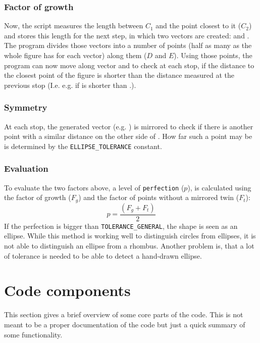 \documentclass[12pt, a4paper]{article}
\begin{document}
            \subsubsection*{Factor of growth}
                Now, the script measures the length between $C_1$ and the point closest to it ($C_2$) and stores this length for the next step, in which two vectors are created:  and . The program divides those vectors into a number of points (half as many as the whole figure has for each vector) along them ($D$ and $E$). Using those points, the program can now move along vector  and  to check at each stop, if the distance to the closest point of the figure is shorter than the distance measured at the previous stop (I.e. e.g. if  is shorter than .). 

            \subsubsection*{Symmetry}
                At each stop, the generated vector (e.g. ) is mirrored to check if there is another point with a similar distance on the other side of . How far such a point may be is determined by the \texttt{ELLIPSE\_TOLERANCE} constant.\hfill

            \subsubsection*{Evaluation}
                To evaluate the two factors above, a level of \texttt{perfection} ($p$), is calculated using the factor of growth ($F_g$) and the factor of points without a mirrored twin ($F_t$): $$p=\frac{(F_g + F_t)}{2}$$ If the perfection is bigger than \texttt{TOLERANCE\_GENERAL}, the shape is seen as an ellipse. While this method is working well to distinguish circles from ellipses, it is not able to distinguish an ellipse from a rhombus. Another problem is, that a lot of tolerance is needed to be able to detect a hand-drawn ellipse.

    \section{Code components}
        This section gives a brief overview of some core parts of the code. This is not meant to be a proper documentation of the code but just a quick summary of some functionality.
\end{document}
